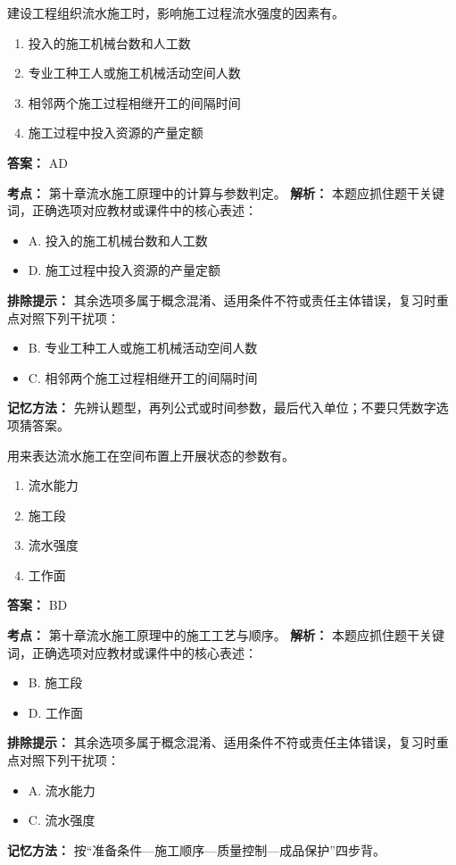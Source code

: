 \documentclass[UTF8,fontset=fandol,11pt]{ctexart}
\begin{document}
\begin{quizbox}[title={第 19 题}]
建设工程组织流水施工时，影响施工过程流水强度的因素有。\\
\begin{enumerate}[label=\Alph*.]
\item 投入的施工机械台数和人工数
\item 专业工种工人或施工机械活动空间人数
\item 相邻两个施工过程相继开工的间隔时间
\item 施工过程中投入资源的产量定额
\end{enumerate}
\textbf{答案：} AD
\vspace{0.25em}
\begin{answerbox}[title={考点解析}]
\textbf{考点：} 第十章流水施工原理中的计算与参数判定。
\textbf{解析：} 本题应抓住题干关键词，正确选项对应教材或课件中的核心表述：
\begin{itemize}
\item A. 投入的施工机械台数和人工数
\item D. 施工过程中投入资源的产量定额
\end{itemize}
\textbf{排除提示：} 其余选项多属于概念混淆、适用条件不符或责任主体错误，复习时重点对照下列干扰项：
\begin{itemize}
\item B. 专业工种工人或施工机械活动空间人数
\item C. 相邻两个施工过程相继开工的间隔时间
\end{itemize}
\textbf{记忆方法：} 先辨认题型，再列公式或时间参数，最后代入单位；不要只凭数字选项猜答案。
\end{answerbox}
\end{quizbox}

\begin{quizbox}[title={第 20 题}]
用来表达流水施工在空间布置上开展状态的参数有。\\
\begin{enumerate}[label=\Alph*.]
\item 流水能力
\item 施工段
\item 流水强度
\item 工作面
\end{enumerate}
\textbf{答案：} BD
\vspace{0.25em}
\begin{answerbox}[title={考点解析}]
\textbf{考点：} 第十章流水施工原理中的施工工艺与顺序。
\textbf{解析：} 本题应抓住题干关键词，正确选项对应教材或课件中的核心表述：
\begin{itemize}
\item B. 施工段
\item D. 工作面
\end{itemize}
\textbf{排除提示：} 其余选项多属于概念混淆、适用条件不符或责任主体错误，复习时重点对照下列干扰项：
\begin{itemize}
\item A. 流水能力
\item C. 流水强度
\end{itemize}
\textbf{记忆方法：} 按“准备条件—施工顺序—质量控制—成品保护”四步背。
\end{answerbox}
\end{quizbox}
\end{document}
